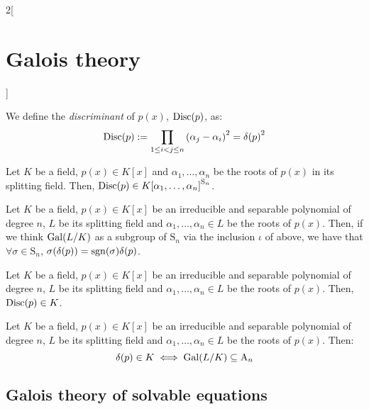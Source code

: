 \documentclass[../../../main.tex]{subfiles}
\begin{document}
\begin{multicols}{2}[\section{Galois theory}]
\begin{definition}
    We define the \emph{discriminant} of $p(x)$, $\operatorname{Disc}(p)$, as: $$\operatorname{Disc}(p):=\prod_{1\leq i<j\leq n}{(\alpha_j-\alpha_i)}^2={\delta(p)}^2$$
  \end{definition}
  \begin{prop}
    Let $K$ be a field, $p(x)\in K[x]$ and $\alpha_1,\ldots,\alpha_n$ be the roots of $p(x)$ in its splitting field. Then, $\operatorname{Disc} (p)\in {K[\alpha_1,\ldots,\alpha_n]}^{\text{S}_n}$.
  \end{prop}
  \begin{lemma}
    Let $K$ be a field, $p(x)\in K[x]$ be an irreducible and separable polynomial of degree $n$, $L$ be its splitting field and $\alpha_1,\ldots,\alpha_n\in L$ be the roots of $p(x)$. Then, if we think $\Gal(\quot{L}{K})$ as a subgroup of $\text{S}_n$ via the inclusion $\iota$ of above, we have that $\forall \sigma\in \text{S}_n$, $\sigma(\delta(p))=\operatorname{sgn}(\sigma)\delta(p)$.
  \end{lemma}
  \begin{corollary}
    Let $K$ be a field, $p(x)\in K[x]$ be an irreducible and separable polynomial of degree $n$, $L$ be its splitting field and $\alpha_1,\ldots,\alpha_n\in L$ be the roots of $p(x)$. Then, $\operatorname{Disc}(p)\in K$.
  \end{corollary}
  \begin{corollary}
    Let $K$ be a field, $p(x)\in K[x]$ be an irreducible and separable polynomial of degree $n$, $L$ be its splitting field and $\alpha_1,\ldots,\alpha_n\in L$ be the roots of $p(x)$. Then: $$\delta(p)\in K\iff \operatorname{Gal}(L/K)\subseteq \text{A}_n$$
  \end{corollary}
  \subsection{Galois theory of solvable equations}

\end{multicols}
\end{document}
